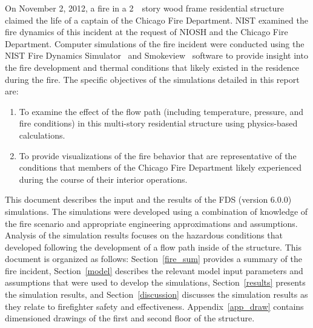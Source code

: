 \documentclass[12pt,oneside]{book}
\begin{document}
On November 2, 2012, a fire in a 2~~story wood frame residential structure claimed the life of a captain of the Chicago Fire Department. NIST examined the fire dynamics of this incident at the request of NIOSH and the Chicago Fire Department. Computer simulations of the fire incident were conducted using the NIST Fire Dynamics Simulator~\cite{FDS_Users_Guide} and Smokeview~\cite{Smokeview_Users_Guide}  software to provide insight into the fire development and thermal conditions that likely existed in the residence during the fire. The specific objectives of the simulations detailed in this report are: 
\begin{enumerate}
\item To examine the effect of the flow path (including temperature, pressure, and fire conditions) in this multi-story residential structure using physics-based calculations.
\item To provide visualizations of the fire behavior that are representative of the conditions that members of the Chicago Fire Department likely experienced during the course of their interior operations.
\end{enumerate}
This document describes the input and the results of the FDS (version 6.0.0) simulations. The simulations were developed using a combination of knowledge of the fire scenario and appropriate engineering approximations and assumptions. Analysis of the simulation results focuses on the hazardous conditions that developed following the development of a flow path inside of the structure. This document is organized as follows: Section~\ref{fire_sum} provides a summary of the fire incident, Section~\ref{model} describes the relevant model input parameters and assumptions that were used to develop the simulations, Section~\ref{results} presents the simulation results, and Section~\ref{discussion} discusses the simulation results as they relate to firefighter safety and effectiveness. Appendix~\ref{app_draw} contains dimensioned drawings of the first and second floor of the structure.
\end{document}
